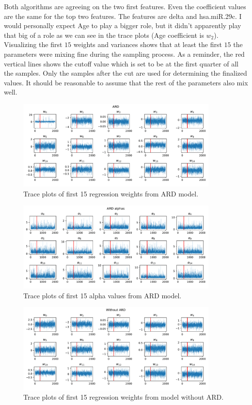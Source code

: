 \documentclass[12pt]{article}
\begin{document}
    Both algorithms are agreeing on the two first features. Even the coefficient values are the same for the top two features. The features are delta and hsa.miR.29c. I would personally expect Age to play a bigger role, but it didn't apparently play that big of a role as we can see in the trace plots (Age coefficient is $w_2$).  Visualizing the first $15$ weights and variances shows that at least the first $15$ the parameters were mixing fine during the sampling process. As a reminder, the red vertical lines shows the cutoff value which is set to be at the first quarter of all the samples. Only the samples after the cut are used for determining the finalized values. It should be reasonable to assume that the rest of the parameters also mix well. 
    \begin{figure}[H]
        \centering
        \includegraphics[width=0.9\textwidth]{real_w_traces_ard}
        \caption{Trace plots of first 15 regression weights from ARD model.}
    \end{figure}
    \begin{figure}[H]
        \centering
        \includegraphics[width=0.9\textwidth]{real_alpha_traces_ard}
        \caption{Trace plots of first 15 alpha values from ARD model.}
    \end{figure}
    \begin{figure}[H]
        \centering
        \includegraphics[width=0.9\textwidth]{real_w_traces_regular}
        \caption{Trace plots of first 15 regression weights from model without ARD.}
    \end{figure}
\end{document}

